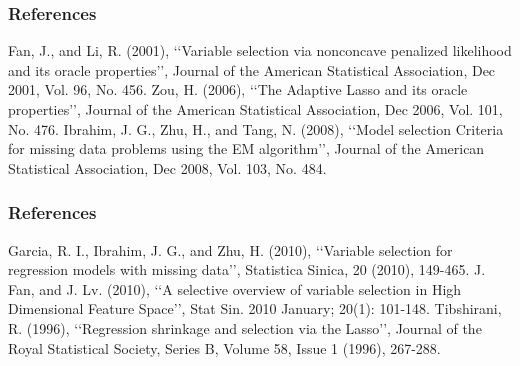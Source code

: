 \documentclass{beamer}
\begin{document}
\begin{frame}
\frametitle{References}
\begin{thebibliography}{99} %
 Fan, J., and Li, R. (2001), \lq\lq{}Variable selection via nonconcave penalized likelihood and its oracle properties\rq\rq{}, Journal of the American Statistical Association, Dec 2001, Vol. 96, No. 456.
 Zou, H. (2006), \lq\lq{}The Adaptive Lasso and its oracle properties\rq\rq{}, Journal of the American Statistical Association, Dec 2006, Vol. 101, No. 476. 
 Ibrahim, J. G., Zhu, H., and Tang, N. (2008), \lq\lq{}Model selection Criteria for missing data problems using the EM algorithm\rq\rq{}, Journal of the American Statistical Association, Dec 2008, Vol. 103, No. 484.
\end{thebibliography}
\end{frame}
\begin{frame}
\frametitle{References}
\begin{thebibliography}{99} %
 Garcia, R. I., Ibrahim, J. G., and Zhu, H. (2010), \lq\lq{}Variable selection for regression models with missing data\rq\rq{}, Statistica Sinica, 20 (2010), 149-465.
 J. Fan, and J. Lv. (2010), \lq\lq{}A selective overview of variable selection in High Dimensional Feature Space\rq\rq{}, Stat Sin. 2010 January; 20(1): 101-148.
 Tibshirani, R. (1996), \lq\lq{}Regression shrinkage and selection via the Lasso\rq\rq{}, Journal of the Royal Statistical Society, Series B, Volume 58, Issue 1 (1996), 267-288.
\end{thebibliography}
\end{frame}

\end{document}
